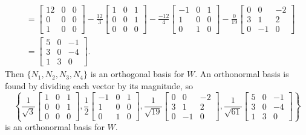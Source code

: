 \begin{example}
\begin{align*}
	&= \left[ \begin{array}{ccc} 12&0&0\\0&0&0\\1&0&0 \end{array} \right] - \frac{12}{3}\left[ \begin{array}{ccc} 1&0&1\\0&0&1\\0&0&0 \end{array} \right] - \frac{-12}{4}\left[ \begin{array}{rcc} -1&0&1\\1&0&0\\0&1&0 \end{array} \right] - \frac{0}{19} \left[ \begin{array}{crr} 0&0&-2\\3&1&2\\0&-1&0 \end{array} \right] \\
	&=\left[  \begin{array}{ccr} 5&0&-1\\3&0&-4\\1&3&0 \end{array} \right].
\end{align*}
Then $\{N_1, N_2, N_3, N_4\}$ is an orthogonal basis for $W$. An orthonormal basis is found by dividing each vector by its magnitude, so 
\[\left\{\frac{1}{\sqrt{3}}\left[ \begin{array}{ccc} 1&0&1\\0&0&1\\0&0&0 \end{array} \right], \frac{1}{2}\left[ \begin{array}{rcc} -1&0&1\\1&0&0\\0&1&0 \end{array} \right],  \frac{1}{\sqrt{19}}\left[  \begin{array}{crr} 0&0&-2\\3&1&2\\0&-1&0 \end{array} \right], \frac{1}{\sqrt{61}}\left[  \begin{array}{ccr} 5&0&-1\\3&0&-4\\1&3&0 \end{array} \right]\right\}\]
is an orthonormal basis for $W$. 

\end{example}

